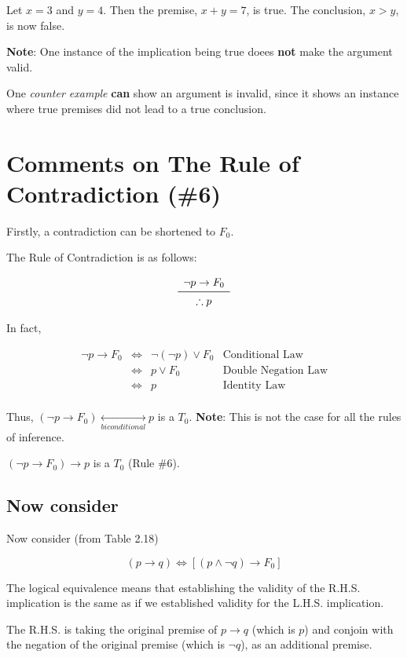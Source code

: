 \documentclass{article}
\newcommand{\logicrule}[2]{
\begin{array}{c}
#1 \\
\midrule
\therefore #2 \\
\end{array}
}
\begin{document}
Let $x=3$ and $y=4$. Then the premise, $x+y=7$, is true. The
conclusion, $x>y$, is now false.

\textbf{Note}: One instance of the implication being true doees
\textbf{not} make the argument valid.

One \textit{counter example} \textbf{can} show an argument is invalid,
since it shows an instance where true premises did not lead to a true
conclusion.

\section*{Comments on The Rule of Contradiction (\#6)}

Firstly, a contradiction can be shortened to $F_0$.

The Rule of Contradiction is as follows:

\[
\logicrule{\neg p\rightarrow F_0}{p}
\]

In fact,

\[
\begin{array}{rcl|l}
\neg p\rightarrow F_0 & \Leftrightarrow & \neg(\neg p)\vee F_0 & \text{Conditional Law} \\
                      & \Leftrightarrow & p\vee F_0& \text{Double Negation Law} \\
                      & \Leftrightarrow & p & \text{Identity Law} \\
\end{array}
\]

Thus,
$(\neg{}p\rightarrow{}F_0)\underset{biconditional}{\leftrightarrow}p$
is a $T_0$. \textbf{Note}: This is not the case for all the rules of
inference.

$(\neg{}p\rightarrow{}F_0)\rightarrow{}p$ is a $T_0$ (Rule \#6).

\subsection*{Now consider}

Now consider (from Table 2.18)

\[
(p\rightarrow q)\Leftrightarrow\left\lbrack(p\wedge\neg q)\rightarrow F_0\right\rbrack
\]

The logical equivalence means that establishing the validity of the
R.H.S. implication is the same as if we established validity for the
L.H.S. implication.

The R.H.S. is taking the original premise of $p\rightarrow{}q$ (which
is $p$) and conjoin with the negation of the original premise (which
is $\neg{}q$), as an additional premise.
\end{document}
